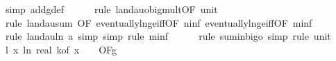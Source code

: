 \begin{isabellebody}
\ {\isacharparenleft}{\kern0pt}simp\ add{\isacharcolon}{\kern0pt}g{\isacharunderscore}{\kern0pt}def{\isacharparenright}{\kern0pt}\isanewline
\ \ \ \ \isamarkupfalse%
\ {\isacharparenleft}{\kern0pt}rule\ landau{\isacharunderscore}{\kern0pt}o{\isachardot}{\kern0pt}big{\isacharunderscore}{\kern0pt}mult{\isacharunderscore}{\kern0pt}{}{\isacharprime}{\kern0pt}{\isacharbrackleft}{\kern0pt}OF\ unit{\isacharunderscore}{\kern0pt}{}{\isacharbrackright}{\kern0pt}{\isacharparenright}{\kern0pt}\isanewline
\ \ \ \ \isamarkupfalse%
\ {\isacharparenleft}{\kern0pt}rule\ landau{\isacharunderscore}{\kern0pt}sum{\isacharunderscore}{\kern0pt}{}\ {\isacharbrackleft}{\kern0pt}OF\ eventually{\isacharunderscore}{\kern0pt}ln{\isacharunderscore}{\kern0pt}ge{\isacharunderscore}{\kern0pt}iff{\isacharbrackleft}{\kern0pt}OF\ n{\isacharunderscore}{\kern0pt}inf{\isacharbrackright}{\kern0pt}\ eventually{\isacharunderscore}{\kern0pt}ln{\isacharunderscore}{\kern0pt}ge{\isacharunderscore}{\kern0pt}iff{\isacharbrackleft}{\kern0pt}OF\ m{\isacharunderscore}{\kern0pt}inf{\isacharbrackright}{\kern0pt}{\isacharbrackright}{\kern0pt}{\isacharparenright}{\kern0pt}\isanewline
\ \ \ \ \isamarkupfalse%
\ {\isacharparenleft}{\kern0pt}rule\ landau{\isacharunderscore}{\kern0pt}ln{\isacharunderscore}{\kern0pt}{}{\isacharbrackleft}{\kern0pt}\ a{\isacharequal}{\kern0pt}{\isachardoublequoteopen}{}{\isachardoublequoteclose}{\isacharbrackright}{\kern0pt}{\isacharcomma}{\kern0pt}\ simp{\isacharcomma}{\kern0pt}\ simp{\isacharcomma}{\kern0pt}\ rule\ m{\isacharunderscore}{\kern0pt}inf{\isacharparenright}{\kern0pt}\isanewline
\ \ \ \ \isamarkupfalse%
\ {\isacharparenleft}{\kern0pt}rule\ sum{\isacharunderscore}{\kern0pt}in{\isacharunderscore}{\kern0pt}bigo{\isacharcomma}{\kern0pt}\ simp{\isacharcomma}{\kern0pt}\ rule\ unit{\isacharunderscore}{\kern0pt}{}{\isacharparenright}{\kern0pt}\isanewline
\isanewline
\ \ \isamarkupfalse%
\ l{}{\isacharcolon}{\kern0pt}\ {\isachardoublequoteopen}{\isacharparenleft}{\kern0pt}{\isasymlambda}x{\isachardot}{\kern0pt}\ ln\ {\isacharparenleft}{\kern0pt}real\ {\isacharparenleft}{\kern0pt}k{\isacharunderscore}{\kern0pt}of\ x{\isacharparenright}{\kern0pt}\ {\isacharplus}{\kern0pt}\ {}{\isacharparenright}{\kern0pt}{\isacharparenright}{\kern0pt}\ {\isasymin}\ O{\isacharbrackleft}{\kern0pt}{\isacharquery}{\kern0pt}F{\isacharbrackright}{\kern0pt}{\isacharparenleft}{\kern0pt}g{}{\isacharparenright}{\kern0pt}{\isachardoublequoteclose}\isanewline

\end{isabellebody}

